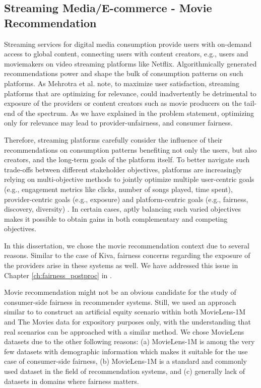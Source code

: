     \subsection{Streaming Media/E-commerce - Movie Recommendation}

    Streaming services for digital media consumption provide users with on-demand access to global content, connecting users with content creators, e.g., users and moviemakers on video streaming platforms like Netflix. Algorithmically generated recommendations power and shape the bulk of consumption patterns on such platforms. As Mehrotra et al. \cite{Mehrotra2018Towards} note, to maximize user satisfaction, streaming platforms that are optimizing for relevance, could inadvertently be detrimental to exposure of the providers or content creators such as movie producers on the tail-end of the spectrum. As we have explained in the problem statement, optimizing only for relevance may lead to provider-unfairness, and consumer fairness.
    
    Therefore, streaming platforms carefully consider the influence of their recommendations on consumption patterns benefiting not only the users, but also creators, and the long-term goals of the platform itself. To better navigate such trade-offs between different stakeholder objectives, platforms are increasingly relying on multi-objective methods to jointly optimize multiple user-centric goals (e.g., engagement metrics like clicks, number of songs played, time spent), provider-centric goals (e.g., exposure) and platform-centric goals (e.g., fairness, discovery, diversity) \cite{mehrotra2020bandit}. In certain cases, aptly balancing such varied objectives makes it possible to obtain gains in both complementary and competing objectives.
    
    In this dissertation, we chose the movie recommendation context due to several reasons. Similar to the case of Kiva, fairness concerns regarding the exposure of the providers arise in these systems as well. We have addressed this issue in Chapter \ref{ch:fairness_postproc} in \cite{sonboli2020opportunistic,liu2019farpfar}.
    
    
    Movie recommendation might not be an obvious candidate for the study of consumer-side fairness in recommender systems. Still, we used an approach similar to \cite{yao2017beyond} to construct an artificial equity scenario within both MovieLens-1M and The Movies data for expository purposes only, with the understanding that real scenarios can be approached with a similar method. We chose MovieLens datasets due to the other following reasons: (a) MovieLens-1M is among the very few datasets with demographic information which makes it suitable for the use case of consumer-side fairness, (b) MovieLens-1M is a standard and commonly used dataset in the field of recommendation systems, and (c) generally lack of datasets in domains where fairness matters.


